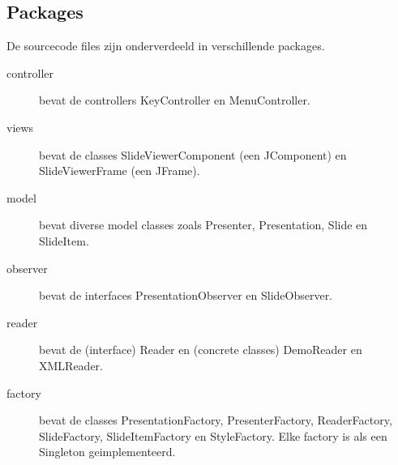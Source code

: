 \documentclass[a4paper]{article}
\begin{document}
\subsection{Packages}
De sourcecode files zijn onderverdeeld in verschillende packages.
\begin{description}
\item[controller] bevat de controllers KeyController en MenuController.
\item[views] bevat de classes SlideViewerComponent (een JComponent) en SlideViewerFrame (een JFrame).
\item[model] bevat diverse model classes zoals Presenter, Presentation, Slide en SlideItem.
\item[observer] bevat de interfaces PresentationObserver en SlideObserver.
\item[reader] bevat de (interface) Reader en (concrete classes) DemoReader en XMLReader.
\item[factory] bevat de classes PresentationFactory, PresenterFactory, ReaderFactory, SlideFactory, SlideItemFactory en StyleFactory. Elke factory is als een Singleton geimplementeerd.

\end{description}
\end{document}
